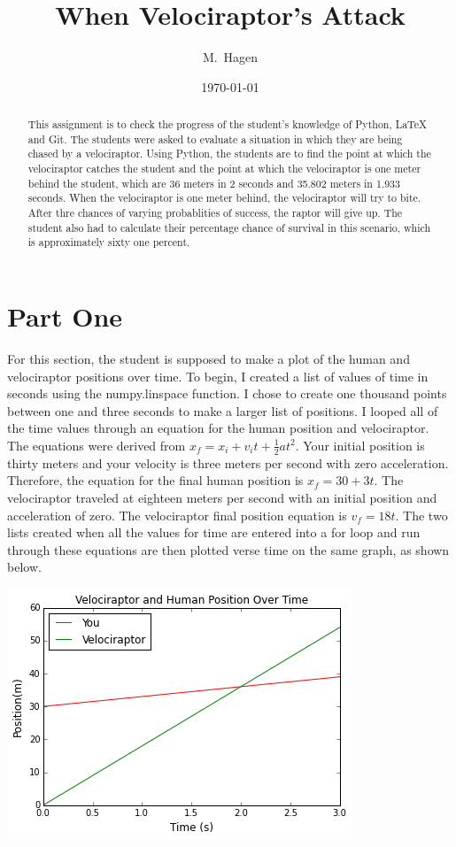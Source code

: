 \documentclass[twocolumn]{revtex4}
\begin{document}
\title{
When Velociraptor's Attack
}

\author{M.~Hagen}

\date{\today}

\begin{abstract}
    This assignment is to check the progress of the student's knowledge of Python, LaTeX and Git. The students were asked to evaluate a situation in which they are being chased by a velociraptor. Using Python, the students are to find the point at which the velociraptor catches the student and the point at which the velociraptor is one meter behind the student, which are 36 meters in 2 seconds and 35.802 meters in 1.933 seconds. When the velociraptor is one meter behind, the velociraptor will try to bite. After thre chances of varying probablities of success, the raptor will give up. The student also had to calculate their percentage chance of survival in this scenario, which is approximately sixty one percent.
\end{abstract}

\maketitle
\section{Part One}
	For this section, the student is supposed to make a plot of the human and velociraptor positions over time. To begin, I created a list of values of time in seconds using the numpy.linspace function. I chose to create one thousand points between one and three seconds to make a larger list of positions. I looped all of the time values through an equation for the human position and velociraptor. The equations were derived from $x_f = x_i + v_it + \frac{1}{2}at^2$. Your initial position is thirty meters and your velocity is three meters per second with zero acceleration. Therefore, the equation for the final human position is $x_f = 30 + 3t$. The velociraptor traveled at eighteen meters per second with an initial position and acceleration of zero. The velociraptor final position equation is $v_f = 18t$. The two lists created when all the values for time are entered into a for loop and run through these equations are then plotted verse time on the same graph, as shown below.  

\includegraphics[scale=.6]{graph1.png}
\end{document}
